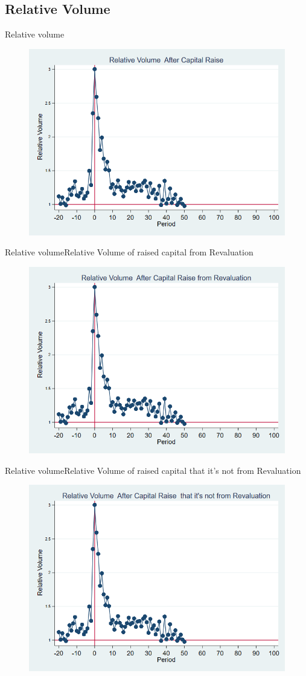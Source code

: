 \documentclass{beamer}
\begin{document}
\subsection{Relative Volume}
\begin{frame}{Relative volume}
\begin{figure}
\centering
\includegraphics[width=0.7\linewidth]{Output/Relvolume.png}
\label{fig:relvolume}
\end{figure}
\end{frame}
\begin{frame}{Relative volume}{Relative Volume of raised capital from Revaluation}
\begin{figure}
\centering
\includegraphics[width=0.7\linewidth]{Output/Relvolume_Revaluation.png}
\label{fig:relvolumerevaluation}
\end{figure}
\end{frame}
\begin{frame}{Relative volume}{Relative Volume of raised capital that it's not from Revaluation}
\begin{figure}
\centering
\includegraphics[width=0.7\linewidth]{Output/Relvolume_NoRevaluation.png}
\label{fig:relvolumenorevaluation}
\end{figure}
\end{frame}
\end{document}
